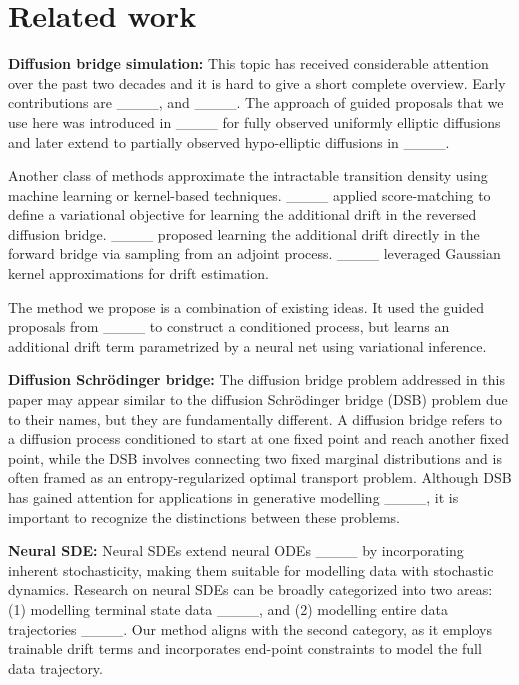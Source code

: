 \section{Related work}
\textbf{Diffusion bridge simulation:} 
This topic has received considerable attention over the past two decades and it is hard to give a short complete overview. Early contributions are ____, and ____. The approach of guided proposals that we use here was introduced in ____ for fully observed uniformly elliptic diffusions and later extend to partially observed hypo-elliptic diffusions in ____.

Another class of methods approximate the intractable transition density using machine learning or kernel-based techniques.  ____ applied score-matching to define a variational objective for learning the additional drift in the reversed diffusion bridge. ____ proposed learning the additional drift directly in the forward bridge via sampling from an adjoint process. ____ leveraged Gaussian kernel approximations for drift estimation. 

The method we propose is a combination of existing ideas. It used the guided proposals from ____ to construct a conditioned process, but learns an additional drift term parametrized by a neural net using variational inference. 

\textbf{Diffusion Schrödinger bridge:} The diffusion bridge problem addressed in this paper may appear similar to the diffusion Schrödinger bridge (DSB) problem due to their names, but they are fundamentally different. A diffusion bridge refers to a diffusion process conditioned to start at one fixed point and reach another fixed point, while the DSB involves connecting two fixed marginal distributions and is often framed as an entropy-regularized optimal transport problem. Although DSB has gained attention for applications in generative modelling ____, it is important to recognize the distinctions between these problems.

\textbf{Neural SDE:} Neural SDEs extend neural ODEs ____ by incorporating inherent stochasticity, making them suitable for modelling data with stochastic dynamics. Research on neural SDEs can be broadly categorized into two areas: (1) modelling terminal state data ____, and (2) modelling entire data trajectories ____. Our method aligns with the second category, as it employs trainable drift terms and incorporates end-point constraints to model the full data trajectory.